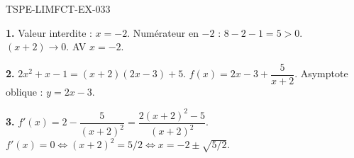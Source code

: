 \begin{corrige}{TSPE-LIMFCT-EX-033}

\textbf{1.} Valeur interdite : $x = -2$. Numérateur en $-2$ : $8-2-1 = 5 > 0$. $(x+2) \to 0$. AV $x = -2$.

\textbf{2.} $2x^2+x-1 = (x+2)(2x-3) + 5$. $f(x) = 2x - 3 + \dfrac{5}{x+2}$. Asymptote oblique : $y = 2x - 3$.

\textbf{3.} $f'(x) = 2 - \dfrac{5}{(x+2)^2} = \dfrac{2(x+2)^2-5}{(x+2)^2}$. $f'(x) = 0 \iff (x+2)^2 = 5/2 \iff x = -2 \pm \sqrt{5/2}$.

\end{corrige}
